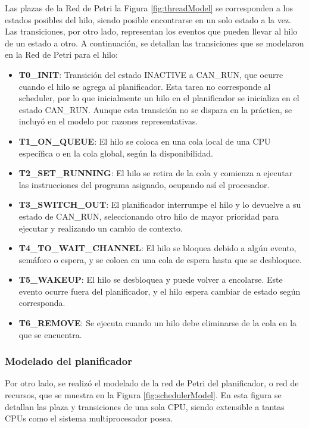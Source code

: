 Las plazas de la Red de Petri la Figura \ref{fig:threadModel} se corresponden a los estados posibles del hilo, siendo posible encontrarse en un solo estado a la vez. Las transiciones, por otro lado, representan los eventos que pueden llevar al hilo de un estado a otro. A continuación, se detallan las transiciones que se modelaron en la Red de Petri para el hilo:

\begin{itemize}
    \item \textbf{T0\_INIT}: Transición del estado INACTIVE a CAN\_RUN, que ocurre cuando el hilo se agrega al planificador. Esta tarea no corresponde al scheduler, por lo que inicialmente un hilo en el planificador se inicializa en el estado CAN\_RUN. Aunque esta transición no se dispara en la práctica, se incluyó en el modelo por razones representativas.
    \item \textbf{T1\_ON\_QUEUE}: El hilo se coloca en una cola local de una CPU específica o en la cola global, según la disponibilidad.
    \item \textbf{T2\_SET\_RUNNING}: El hilo se retira de la cola y comienza a ejecutar las instrucciones del programa asignado, ocupando así el procesador.
    \item \textbf{T3\_SWITCH\_OUT}: El planificador interrumpe el hilo y lo devuelve a su estado de CAN\_RUN, seleccionando otro hilo de mayor prioridad para ejecutar y realizando un cambio de contexto.
    \item \textbf{T4\_TO\_WAIT\_CHANNEL}: El hilo se bloquea debido a algún evento, semáforo o espera, y se coloca en una cola de espera hasta que se desbloquee.
    \item \textbf{T5\_WAKEUP}: El hilo se desbloquea y puede volver a encolarse. Este evento ocurre fuera del planificador, y el hilo espera cambiar de estado según corresponda.
    \item \textbf{T6\_REMOVE}: Se ejecuta cuando un hilo debe eliminarse de la cola en la que se encuentra.
\end{itemize}


\subsubsection{Modelado del planificador}

Por otro lado, se realizó el modelado de la red de Petri del planificador, o red de recursos, que se muestra en la Figura \ref{fig:schedulerModel}. En esta figura se detallan las plaza y transiciones de una sola CPU, siendo extensible a tantas CPUs como el sistema multiprocesador posea.

